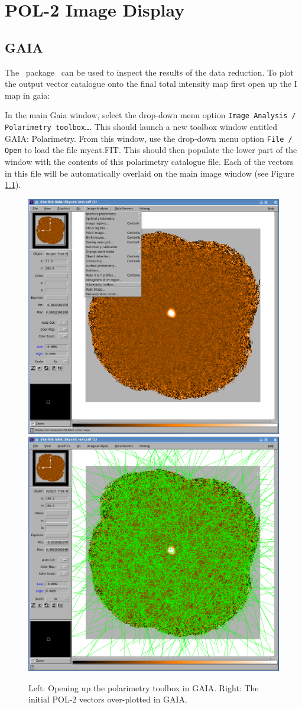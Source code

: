 \chapter{POL-2 Image Display}
\label{sec:display}

\section{GAIA}

The \starlink\ package \gaia\ can be used to inspect the results of
the data reduction.  To plot the output vector catalogue onto the
final total intensity map first open up the I map in gaia:

\begin{terminalv}
\end{terminalv}


In the main Gaia window, select the drop-down menu option
\texttt{Image Analysis / Polarimetry toolbox…}. This should launch a
new toolbox window entitled GAIA: Polarimetry. From this window, use
the drop-down menu option \texttt{File / Open} to load the file
mycat.FIT. This should then populate the lower part of the window with
the contents of this polarimetry catalogue file.  Each of the vectors
in this file will be automatically overlaid on the main image window
(see Figure \ref{fig:gaiavectorsopen}).

\begin{figure}[t!]
\begin{center}
\includegraphics[width=0.46\linewidth]{sc22-gaia-plot-vectors-1.png}
\includegraphics[width=0.46\linewidth]{sc22-gaia-plot-vectors-3.png}
\caption [Over Plotting Vectors in GAIA]{
  Left: Opening up the polarimetry toolbox in GAIA. Right: The initial POL-2
  vectors over-plotted in GAIA.
\label{fig:gaiavectorsopen}
}
\end{center}
\end{figure}

